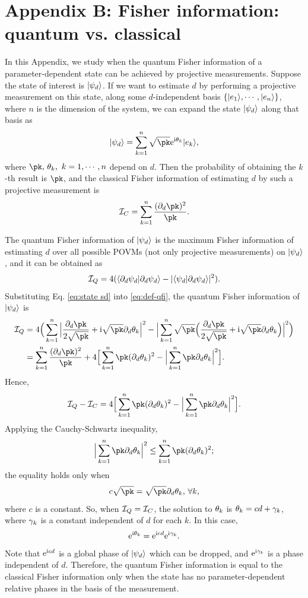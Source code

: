 \section*{Appendix B: Fisher information: quantum vs. classical}

In this Appendix, we study when the quantum Fisher information of
a parameter-dependent state can be achieved by projective measurements.
Suppose the state of interest is $|\psi_{d}\rangle$. If we want to estimate $d$
by performing a projective measurement on this state, along some $d$-independent
basis $\{|e_{1}\rangle,\cdots,|e_{n}\rangle\}$, where $n$ is the dimension of
the system, we can expand the state $|\psi_{d}\rangle$ along that basis as
\begin{equation}
\kd=\sk\sqrt{\pk}\et\bas k,\label{eq:state sd}
\end{equation}
where $\pk,\,\tk,\,\,k=1,\cdots,n$ depend on $d$. Then the probability
of obtaining the $k$-th result is $\pk$, and the classical Fisher
information of estimating $d$ by such a projective measurement is
\begin{equation}
\ic=\sk\frac{(\pd\pk)^{2}}{\pk}.\label{eq:cfi}
\end{equation}


The quantum Fisher information of $|\psi_{d}\rangle$ is the maximum Fisher information
of estimating $d$ over all possible POVMs (not only projective measurements)
on $|\psi_{d}\rangle$, and it can be obtained as
\begin{equation}
\mathcal{I}_{Q}=4(\langle\partial_{d}\psi_{d}|\partial_{d}\psi_{d}\rangle-|\langle\psi_{d}|\partial_{d}\psi_{d}\rangle|^{2}).\label{eq:def-qfi}
\end{equation}
Substituting Eq. \eqref{eq:state sd} into \eqref{eq:def-qfi}, the quantum
Fisher information of $|\psi_{d}\rangle$ is
\begin{equation}
\begin{aligned}\iq & =4\Big(\sk\Big|\frac{\pd\pk}{2\sqrt{\pk}}+\i\sqrt{\pk}\pd\tk\Big|^{2}-\Big|\sk\sqrt{\pk}\Big(\frac{\pd\pk}{2\sqrt{\pk}}+\i\sqrt{\pk}\pd\tk\Big)\Big|^{2}\Big)\\
 & =\sk\frac{(\pd\pk)^{2}}{\pk}+4\Big[\sk\pk(\pd\tk)^{2}-\Big|\sk\pk\pd\tk\Big|^{2}\Big].
\end{aligned}
\end{equation}
Hence,
\begin{equation}
\iq-\ic=4\Big[\sk\pk(\pd\tk)^{2}-\Big|\sk\pk\pd\tk\Big|^{2}\Big].
\end{equation}
Applying the Cauchy-Schwartz inequality,
\begin{equation}
\Big|\sk\pk\pd\tk\Big|^{2}\leq\sk\pk(\pd\tk)^{2};
\end{equation}
the equality holds only when
\begin{equation}
c\sqrt{\pk}=\sqrt{\pk}\pd\tk,\,\forall k,
\end{equation}
where $c$ is a constant. So, when $\mathcal{I}_{Q}=\mathcal{I}_{C}$, the solution to $\theta_{k}$ is $\theta_{k}=cd+\gamma_{k}$,
where $\gamma_{k}$ is a constant independent of $d$ for each $k$. In this case,
\begin{equation}
{\rm e}^{{\rm i}\theta_{k}}={\rm e}^{{\rm i} cd}{\rm e}^{{\rm i}\gamma_{k}}.
\end{equation}
Note that ${\rm e}^{{\rm i} cd}$ is a global phase of $|\psi_{d}\rangle$ which can be dropped,
and ${\rm e}^{{\rm i}\gamma_{k}}$ is a phase independent of $d$. Therefore, the quantum
Fisher information is equal to the classical Fisher information only when the state has no parameter-dependent
relative phases in the basis of the measurement.
